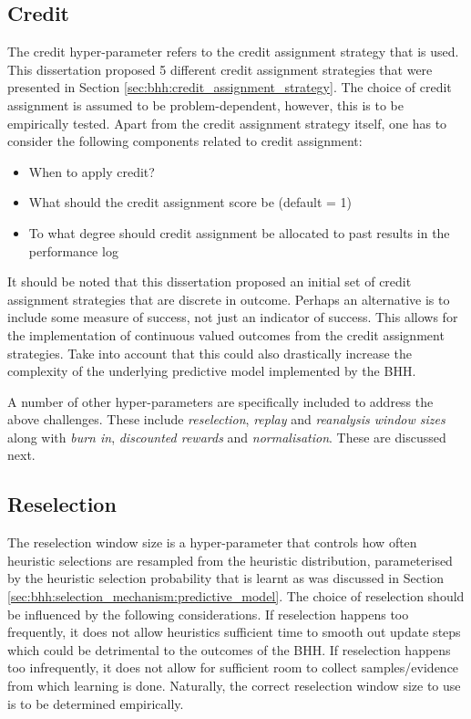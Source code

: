 \subsection{Credit}
\label{sec:bhh:hyper_parameters:credit}

The credit hyper-parameter refers to the credit assignment strategy that is used. This dissertation proposed 5 different credit assignment strategies that were presented in Section \ref{sec:bhh:credit_assignment_strategy}. The choice of credit assignment is assumed to be problem-dependent, however, this is to be empirically tested. Apart from the credit assignment strategy itself, one has to consider the following components related to credit assignment:

\begin{itemize}
      \item When to apply credit?
      \item What should the credit assignment score be (default = 1)
      \item To what degree should credit assignment be allocated to past results in the performance log
\end{itemize}

It should be noted that this dissertation proposed an initial set of credit assignment strategies that are discrete in outcome. Perhaps an alternative is to include some measure of success, not just an indicator of success. This allows for the implementation of continuous valued outcomes from the credit assignment strategies. Take into account that this could also drastically increase the complexity of the underlying predictive model implemented by the \ac{BHH}.

A number of other hyper-parameters are specifically included to address the above challenges. These include \textit{reselection}, \textit{replay} and \textit{reanalysis window sizes} along with \textit{burn in}, \textit{discounted rewards} and \textit{normalisation}. These are discussed next.

\subsection{Reselection}
\label{sec:bhh:hyper_parameters:reselection}

The reselection window size is a hyper-parameter that controls how often heuristic selections are resampled from the heuristic distribution, parameterised by the heuristic selection probability that is learnt as was discussed in Section \ref{sec:bhh:selection_mechanism:predictive_model}. The choice of reselection should be influenced by the following considerations. If reselection happens too frequently, it does not allow heuristics sufficient time to smooth out update steps which could be detrimental to the outcomes of the \ac{BHH}. If reselection happens too infrequently, it does not allow for sufficient room to collect samples/evidence from which learning is done. Naturally, the correct reselection window size to use is to be determined empirically.

